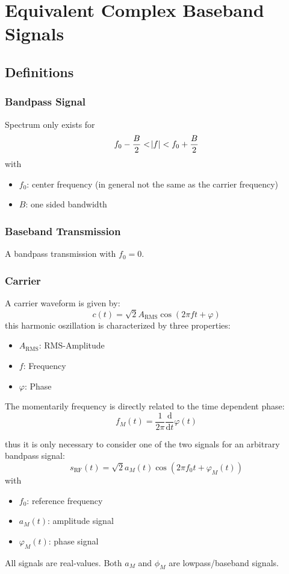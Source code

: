 \chapter{Equivalent Complex Baseband Signals}
\section{Definitions}
\subsection{Bandpass Signal}
Spectrum only exists for
\begin{equation}
    f_0 - \frac{B}{2} < \abs{f} < f_0 + \frac{B}{2}
\end{equation}
with
\begin{itemize}
    \item $f_0$: center frequency (in general not the same as the carrier frequency)
    \item $B$: one sided bandwidth
\end{itemize}

\subsection{Baseband Transmission}
A bandpass transmission with $f_0=0$.

\subsection{Carrier}
A carrier waveform is given by:
\begin{equation}
    c(t) = \sqrt{2} A_\text{RMS} \cos(2 \pi f t + \varphi)
\end{equation}
this harmonic oszillation is characterized by three properties:
\begin{itemize}
    \item $A_\text{RMS}$: RMS-Amplitude
    \item $f$: Frequency
    \item $\varphi$: Phase
\end{itemize}

The momentarily frequency is directly related to the time dependent phase:
\begin{equation}
    f_M(t) = \frac{1}{2\pi} \frac{\text{d}}{\text{d}t} \varphi(t)
\end{equation}

thus it is only necessary to consider one of the two signals for an arbitrary bandpass
signal:
\begin{equation} \label{eq:02:srf}
    s_\text{RF}(t) = \sqrt{2} a_M(t) \cos(2\pi f_0 t + \varphi_M(t))
\end{equation}
with
\begin{itemize}
    \item $f_0$: reference frequency
    \item $a_M(t)$: amplitude signal
    \item $\varphi_M(t)$: phase signal
\end{itemize}
All signals are real-values. Both $a_M$ and $\phi_M$ are lowpass/baseband signals.

